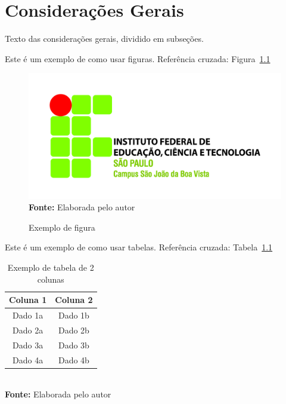 \chapter{Considerações Gerais}
\label{cap:02}

Texto das considerações gerais, dividido em subseções.

Este é um exemplo de como usar figuras. Referência cruzada: Figura~\ref{fig:exemplo}

\FloatBarrier
\begin{figure}[!htbp]
	\centering
	\caption{Exemplo de figura}
	\includegraphics[scale=1.5]{imagens/exemploFigura}
	\\\textbf{Fonte:} Elaborada pelo autor
	\label{fig:exemplo}
\end{figure}
\FloatBarrier


Este é um exemplo de como usar tabelas. Referência cruzada: Tabela~\ref{tab:exemplo}

\FloatBarrier
\begin{table}[!htbp]
	\centering
	\caption{Exemplo de tabela de 2 colunas}
	\begin{tabular}{ c | c }
		\hline
		\textbf{Coluna 1} & \textbf{Coluna 2} \\ \hline
		Dado 1a           & Dado 1b           \\ \hline
		Dado 2a           & Dado 2b           \\ \hline
		Dado 3a           & Dado 3b           \\ \hline
		Dado 4a           & Dado 4b           \\ \hline
	\end{tabular}
	\\ \vspace{0.2cm}
	\textbf{Fonte:} Elaborada pelo autor
	\label{tab:exemplo}
\end{table}
\FloatBarrier


